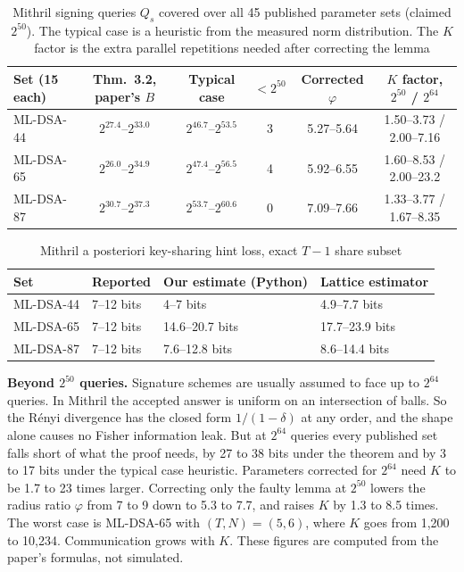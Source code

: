 \documentclass[10pt,conference,a4paper]{IEEEtran}
\begin{document}
\begin{table}[t]
\caption{Mithril signing queries $Q_s$ covered over all 45 published parameter sets (claimed $2^{50}$). The typical case is a
heuristic from the measured norm distribution. The $K$ factor is the extra parallel repetitions needed after correcting the lemma}\label{tab:mithrilqs}
\centering\scriptsize
\begin{tabular}{@{}lccccc@{}}
\toprule
Set (15 each) & Thm.~3.2, paper's $B$ & Typical case & $<2^{50}$ & Corrected $\varphi$ & $K$ factor, $2^{50}$ / $2^{64}$\\
\midrule
ML-DSA-44 & $2^{27.4}$--$2^{33.0}$ & $2^{46.7}$--$2^{53.5}$ & 3 & 5.27--5.64 & 1.50--3.73 / 2.00--7.16\\
ML-DSA-65 & $2^{26.0}$--$2^{34.9}$ & $2^{47.4}$--$2^{56.5}$ & 4 & 5.92--6.55 & 1.60--8.53 / 2.00--23.2\\
ML-DSA-87 & $2^{30.7}$--$2^{37.3}$ & $2^{53.7}$--$2^{60.6}$ & 0 & 7.09--7.66 & 1.33--3.77 / 1.67--8.35\\
\bottomrule
\end{tabular}
\end{table}

\begin{table}[t]
\caption{Mithril a posteriori key-sharing hint loss, exact $T-1$ share subset}\label{tab:hint}
\centering\footnotesize
\begin{tabular}{@{}llll@{}}
\toprule
Set & Reported & Our estimate (Python) & Lattice estimator\\
\midrule
ML-DSA-44 & 7--12 bits & 4--7 bits & 4.9--7.7 bits\\
ML-DSA-65 & 7--12 bits & 14.6--20.7 bits & 17.7--23.9 bits\\
ML-DSA-87 & 7--12 bits & 7.6--12.8 bits & 8.6--14.4 bits\\
\bottomrule
\end{tabular}
\end{table}

\textbf{Beyond $2^{50}$ queries.} Signature schemes are usually assumed to face up to $2^{64}$ queries. In Mithril the
accepted answer is uniform on an intersection of balls. So the R\'enyi divergence has the closed form $1/(1-\delta)$ at any
order, and the shape alone causes no Fisher information leak. But at $2^{64}$ queries every published set falls short of
what the proof needs, by 27 to 38 bits under the theorem and by 3 to 17 bits under the typical case heuristic. Parameters
corrected for $2^{64}$ need $K$ to be 1.7 to 23 times larger. Correcting only the faulty lemma at $2^{50}$ lowers the radius
ratio $\varphi$ from 7 to 9 down to 5.3 to 7.7, and raises $K$ by 1.3 to 8.5 times. The worst case is ML-DSA-65 with
$(T,N)=(5,6)$, where $K$ goes from 1{,}200 to 10{,}234. Communication grows with $K$. These figures are computed from the
paper's formulas, not simulated.
\end{document}
